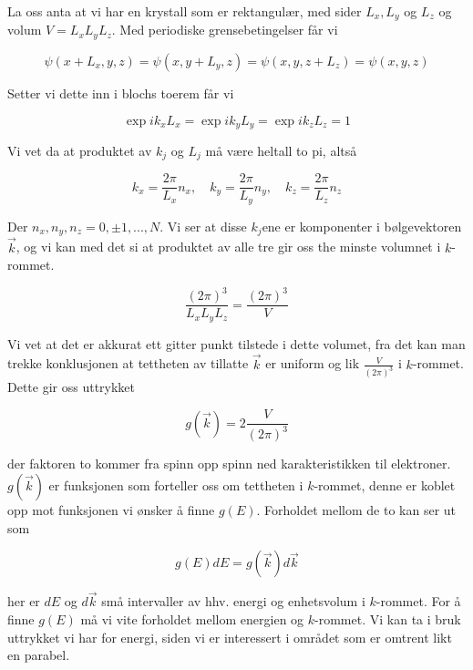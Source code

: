 La oss anta at vi har en krystall som er rektangulær, med sider $L_x,L_y$ og $L_z$ og volum $V=L_xL_yL_z$. Med periodiske grensebetingelser får vi 

\begin{equation*}
    \psi(x+L_x,y,z) = \psi(x,y+L_y,z) = \psi(x,y,z+L_z) = \psi(x,y,z)
\end{equation*}

Setter vi dette inn i blochs toerem får vi

\begin{equation*}
    \exp{ik_xL_x} = \exp{ik_yL_y} = \exp{ik_zL_z} = 1    
\end{equation*}

Vi vet da at produktet av $k_j$ og $L_j$ må være heltall to pi, altså

\begin{equation*}
    k_x=\frac{2\pi}{L_x}n_x, \quad k_y = \frac{2\pi}{L_y}n_y, \quad
    k_z = \frac{2\pi}{L_z}n_z
\end{equation*}

Der $n_x,n_y,n_z=0,\pm 1, ..., N$. Vi ser at disse $k_j$ene er komponenter i bølgevektoren $\Vec{k}$, og vi kan med det si at produktet av alle tre gir oss the minste volumnet i $k$-rommet.

\begin{equation*}
    \frac{(2\pi)^3}{L_xL_yL_z} = \frac{(2\pi)^3}{V}
\end{equation*}

Vi vet at det er akkurat ett gitter punkt tilstede i dette volumet, fra det kan man trekke konklusjonen at tettheten av tillatte $\Vec{k}$ er uniform og lik $\frac{V}{(2\pi)^3}$ i $k$-rommet. Dette gir oss uttrykket 

\begin{equation}
    \label{eq:kTett}
    g(\Vec{k}) = 2 \frac{V}{(2\pi)^3}
\end{equation}

der faktoren to kommer fra spinn opp spinn ned karakteristikken til elektroner. $g(\Vec{k})$ er funksjonen som forteller oss om tettheten i $k$-rommet, denne er koblet opp mot funksjonen vi ønsker å finne $g(E)$. Forholdet mellom de to kan ser ut som

\begin{equation}
    \label{eq:forhold}
    g(E)dE = g(\Vec{k})d\Vec{k}
\end{equation}

her er $dE$ og $d\Vec{k}$ små intervaller av hhv. energi og enhetsvolum i $k$-rommet. For å finne $g(E)$ må vi vite forholdet mellom energien og $k$-rommet. Vi kan ta i bruk uttrykket vi har for energi, siden vi er interessert i området som er omtrent likt en parabel. 

